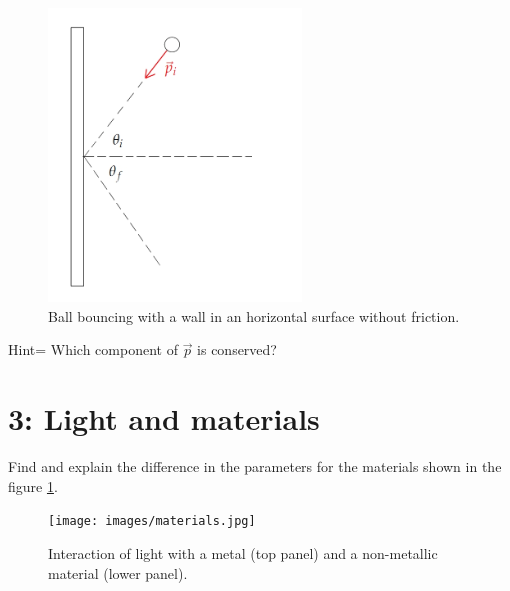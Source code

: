 \documentclass[12pt]{article}
\begin{document}
\begin{figure}[h!]
  \centering
  \includegraphics[width=0.6\textwidth]{images/collision.jpg}
  \caption{ Ball bouncing  with a wall in an horizontal surface without friction.}
  \label{fig:3}
\end{figure}


Hint= Which component of $\vec{p}$ is conserved? 

\newpage

\section*{3: Light and materials}

Find and explain the difference in the parameters for the materials shown in the figure \ref{fig:3}. 

\begin{figure}[h!]
    \centering
    \texttt{[image: images/materials.jpg]}
    \caption{Interaction of light with a metal (top panel) and a non-metallic material (lower panel).}
    \label{fig:4}
  \end{figure}
\end{document}
